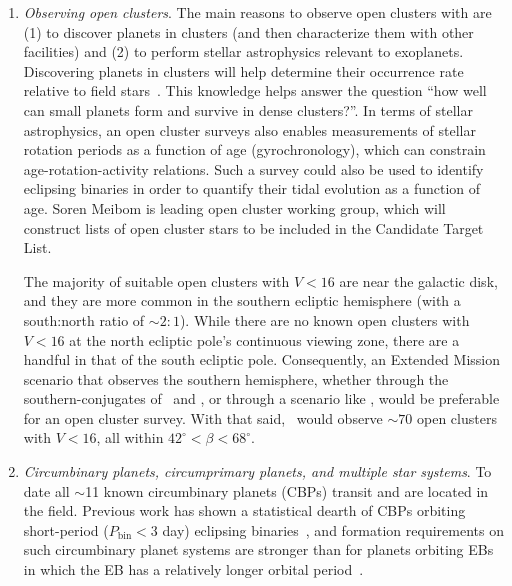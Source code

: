 \begin{enumerate}
	\item \textit{Observing open clusters}.
	The main reasons to observe open clusters with \tess are (1) to discover planets in clusters (and then characterize them with other facilities) and (2) to perform stellar astrophysics relevant to exoplanets.
	Discovering planets in clusters will help determine their occurrence rate relative to field stars~\citep{meibom_same_2013}.
	This knowledge helps answer the question ``how well can small planets form and survive in dense clusters?''. 
	In terms of stellar astrophysics, an open cluster surveys also enables measurements of stellar rotation periods as a function of age (gyrochronology), which can constrain age-rotation-activity relations.
	Such a survey could also be used to identify eclipsing binaries in order to quantify their tidal evolution as a function of age.
	Soren Meibom is leading \tesss open cluster working group, which will construct lists of open cluster stars to be included in the \tess Candidate Target List.
	
	The majority of suitable open clusters with $V<16$ are near the galactic disk, and they are more common in the southern ecliptic hemisphere (with a south:north ratio of $\sim\!2:1$).
	While there are no known open clusters with $V<16$ at the north ecliptic pole's continuous viewing zone, there are a handful in that of the south ecliptic pole.
	Consequently, an Extended Mission scenario that observes the southern hemisphere, whether through the southern-conjugates of \nhemi\ and \npole, or through a scenario like \shemiAvoid, would be preferable for an open cluster survey.
	With that said, \npole\ would observe $\sim70$ open clusters with $V<16$, all within $42^\circ<\beta<68^\circ$.
	
	\item \textit{Circumbinary planets, circumprimary planets, and multiple star systems}.
	To date all $\sim$11 known circumbinary planets (CBPs) transit and are located in the \kepler field.
	Previous work has shown a statistical dearth of CBPs orbiting short-period ($P_\mathrm{bin} < 3$ day) eclipsing binaries~\citep{armstrong_abundance_2014,martin_planets_2014}, and formation requirements on such circumbinary planet systems are stronger than for planets orbiting EBs in which the EB has a relatively longer orbital period~\citep{martin_no_2015}.
	

\end{enumerate}
